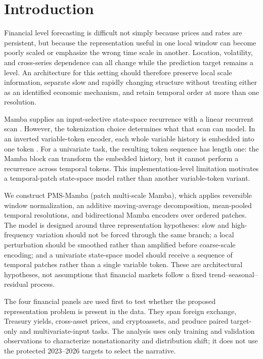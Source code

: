 \section{Introduction}

Financial level forecasting is difficult not simply because prices and rates are persistent, but because the representation useful in one local window can become poorly scaled or emphasize the wrong time scale in another.
Location, volatility, and cross-series dependence can all change while the prediction target remains a level.
An architecture for this setting should therefore preserve local scale information, separate slow and rapidly changing structure without treating either as an identified economic mechanism, and retain temporal order at more than one resolution.

Mamba supplies an input-selective state-space recurrence with a linear recurrent scan \cite{mamba}.
However, the tokenization choice determines what that scan can model.
In an inverted variable-token encoder, each whole variable history is embedded into one token \cite{smamba,itransformer}.
For a univariate task, the resulting token sequence has length one: the Mamba block can transform the embedded history, but it cannot perform a recurrence across temporal tokens.
This implementation-level limitation motivates a temporal-patch state-space model rather than another variable-token variant.

We construct PMS-Mamba (patch multi-scale Mamba), which applies reversible window normalization, an additive moving-average decomposition, mean-pooled temporal resolutions, and bidirectional Mamba encoders over ordered patches.
The model is designed around three representation hypotheses: slow and high-frequency variation should not be forced through the same branch; a local perturbation should be smoothed rather than amplified before coarse-scale encoding; and a univariate state-space model should receive a sequence of temporal patches rather than a single variable token.
These are architectural hypotheses, not assumptions that financial markets follow a fixed trend--seasonal--residual process.

The four financial panels are used first to test whether the proposed representation problem is present in the data.
They span foreign exchange, Treasury yields, cross-asset prices, and cryptoassets, and produce paired target-only and multivariate-input tasks.
The analysis uses only training and validation observations to characterize nonstationarity and distribution shift; it does not use the protected 2023--2026 targets to select the narrative.


